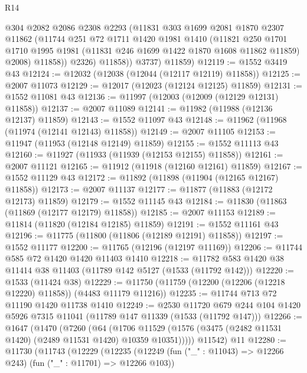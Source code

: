 \begin{lexlean}{R14}
\begin{coremodule}
              @304
              @2082
              @2086
              @2308
              @2293
              (@11831
                @303
                @1699
                @2081
                @1870
                @2307
                @11862
                (@11744
                  @251
                  @72
                  @1711
                  @1420
                  @1981
                  @1410
                  (@11821
                    @250
                    @1701
                    @1710
                    @1995
                    @1981
                    (@11831 @246 @1699 @1422 @1870 @1608 @11862 @11859)
                    @2008)
                  @11858))
              @2326)
            @11858))
        @3737)
      @11859)
@12119 := @1552 @3419 @43
@12124 := @12032 (@12038 (@12044 (@12117 @12119) @11858))
@12125 := @2007 @11073
@12129 := @12017 (@12023 (@12124 @12125) @11859)
@12131 := @1552 @11081 @43
@12136 := @11997 (@12003 (@12009 (@12129 @12131) @11858))
@12137 := @2007 @11089
@12141 := @11982 (@11988 (@12136 @12137) @11859)
@12143 := @1552 @11097 @43
@12148 := @11962 (@11968 (@11974 (@12141 @12143) @11858))
@12149 := @2007 @11105
@12153 := @11947 (@11953 (@12148 @12149) @11859)
@12155 := @1552 @11113 @43
@12160 := @11927 (@11933 (@11939 (@12153 @12155) @11858))
@12161 := @2007 @11121
@12165 := @11912 (@11918 (@12160 @12161) @11859)
@12167 := @1552 @11129 @43
@12172 := @11892 (@11898 (@11904 (@12165 @12167) @11858))
@12173 := @2007 @11137
@12177 := @11877 (@11883 (@12172 @12173) @11859)
@12179 := @1552 @11145 @43
@12184 := @11830 (@11863 (@11869 (@12177 @12179) @11858))
@12185 := @2007 @11153
@12189 := @11814 (@11820 (@12184 @12185) @11859)
@12191 := @1552 @11161 @43
@12196 := @11775 (@11800 (@11806 (@12189 @12191) @11858))
@12197 := @1552 @11177
@12200 := @11765 (@12196 (@12197 @11169))
@12206 := @11744 @585 @72 @1420 @1420 @11403 @1410
@12218 := @11782 @583 @1420 @38 @11414 @38 @11403 (@11789 @142 @5127 (@1533 (@11792 @142)))
@12220 := @1533 (@11424 @38)
@12229 := @11750 (@11759 (@12200 (@12206 (@12218 @12220) @11858)) (@4483 @11179 @11216))
@12235 := @11744 @713 @72 @11190 @1420 @11738 @1410
@12249 := @2530
    @11720
    @679
    @244
    @104
    @1420
    @5926
    @7315
    @11041
    (@11789 @147 @11339 (@1533 (@11792 @147)))
@12266 := @1647
    (@1470
      (@7260
        (@64
          (@1706 @11529 (@1576 (@3475 (@2482 @11531 @1420) (@2489 @11531 @1420) @10359 @10351)))))
      @11542)
    @11
@12280 := @11730
    (@11743
      (@12229
        (@12235
          (@12249 (fun ("_" : @11043) => @12266 @243) (fun ("_" : @11701) => @12266 @103))

\end{coremodule}
\end{lexlean}
